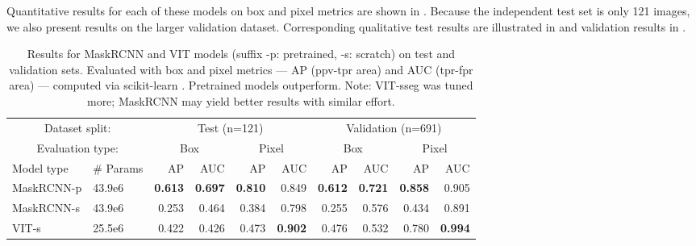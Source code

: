 \documentclass{article}
\begin{document}
Quantitative results for each of these models on box and pixel metrics are shown in
  .
Because the independent test set is only 121 images, we also present results on the larger validation
  dataset.
Corresponding qualitative test results are illustrated in  and validation
  results in .

\newcommand{\tb}[1]{\textbf{#1}}

\begin{table}[t]
\centering
\begin{tabular}{ll|rrrr|rrrr}
\toprule
\multicolumn{2}{c}{Dataset split:} & \multicolumn{4}{c}{Test (n=121)} & \multicolumn{4}{c}{Validation (n=691)} \\
\multicolumn{2}{c}{Evaluation type:} & \multicolumn{2}{c}{Box} & \multicolumn{2}{c}{Pixel} & \multicolumn{2}{c}{Box} & \multicolumn{2}{c}{Pixel} \\
Model type & \# Params & AP         & AUC        & AP         & AUC        & AP         & AUC        & AP         & AUC \\
\midrule
MaskRCNN-p & 43.9e6    & \tb{0.613} & \tb{0.697} & \tb{0.810} & 0.849      & \tb{0.612} & \tb{0.721} & \tb{0.858} & 0.905 \\
MaskRCNN-s & 43.9e6    & 0.253      & 0.464      & 0.384      & 0.798      & 0.255      & 0.576      & 0.434      & 0.891 \\
VIT-s      & 25.5e6    & 0.422      & 0.426      & 0.473      & \tb{0.902} & 0.476      & 0.532      & 0.780      & \tb{0.994} \\
\bottomrule
\end{tabular}
\caption[]{
    Results for MaskRCNN and VIT models (suffix -p: pretrained, -s: scratch) on test and validation sets.
    Evaluated with box and pixel metrics --- AP (ppv-tpr area) \cite{powers_evaluation_2011} and AUC (tpr-fpr area) --- computed via scikit-learn \cite{scikit-learn}.
    Pretrained models outperform.
    Note: VIT-sseg was tuned more; MaskRCNN may yield better results with similar effort.
}
\end{table}
\end{document}
